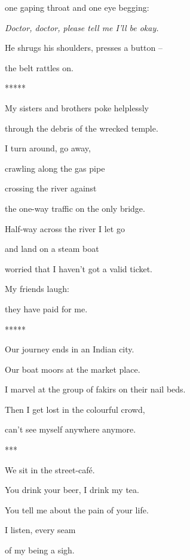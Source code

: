 \documentclass[a4paper]{article}
\begin{document}
one gaping throat and one eye begging:

{\itshape
Doctor, doctor, please tell me I'll be okay.}

He shrugs his shoulders, presses a button – 

the belt rattles on.


\bigskip


\bigskip

*****


\bigskip

My sisters and brothers poke helplessly

through the debris of the wrecked temple.

I turn around, go away, 

crawling along the gas pipe 

crossing the river against 

the one-way traffic on the only bridge.


\bigskip

Half-way across the river I let go

and land on a steam boat

worried that I haven't got a valid ticket.

My friends laugh:

they have paid for me.


\bigskip


\bigskip

*****


\bigskip

Our journey ends in an Indian city.

Our boat moors at the market place.

I marvel at the group of fakirs on their nail beds.

Then I get lost in the colourful crowd,

can't see myself anywhere anymore.


\bigskip


\bigskip

***


\bigskip

We sit in the street-café.

You drink your beer, I drink my tea.

You tell me about the pain of your life.

I listen, every seam 

of my being a sigh.


\bigskip


\bigskip
\end{document}
